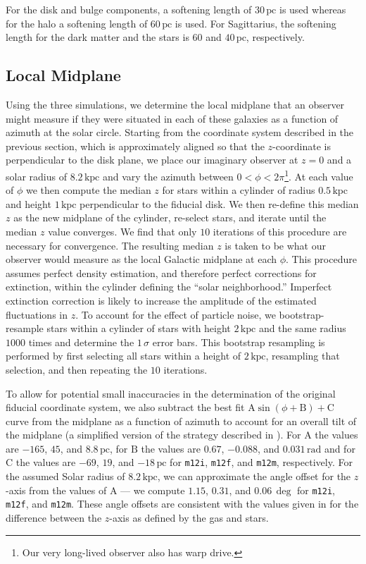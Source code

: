 \documentclass[twocolumn]{aastex62}
\newcommand{\pc}{\text{pc}}
\newcommand{\kpc}{\text{kpc}}
\newcommand{\mi}{\texttt{m12i}}
\newcommand{\mf}{\texttt{m12f}}
\newcommand{\mm}{\texttt{m12m}}
\begin{document}
For the disk and bulge components, a softening length of $30\,\pc$ is used
whereas for the halo a softening length of $60\,\pc$ is used. For Sagittarius,
the softening length for the dark matter and the stars is $60$ and $40\,\pc$,
respectively.

\subsection{Local Midplane} \label{ssec:local_midplane}
Using the three simulations, we determine the local midplane that an observer
might measure if they were situated in each of these galaxies as a function of
azimuth at the solar circle. Starting from the coordinate system described in
the previous section, which is approximately aligned so that the
$z$-coordinate is perpendicular to the disk plane, we place our imaginary
observer at $z=0$ and a solar radius of $8.2\,\kpc$ and vary the azimuth
between $0<\phi<2\pi$\footnote{Our very long-lived observer also has warp
drive.}. At each value of $\phi$ we then compute the median $z$ for stars
within a cylinder of radius $0.5\,\kpc$ and height $1\,\kpc$ perpendicular to
the fiducial disk. We then re-define this median $z$ as the new midplane of
the cylinder, re-select stars, and iterate until the median $z$ value
converges. We find that only $10$ iterations of this procedure are necessary
for convergence. The resulting median $z$ is taken to be what our observer
would measure as the local Galactic midplane at each $\phi$. This procedure
assumes perfect density estimation, and therefore perfect corrections for
extinction, within the cylinder defining the ``solar neighborhood.'' Imperfect
extinction correction is likely to increase the amplitude of the estimated
fluctuations in $z$. To account for the effect of particle noise, we
bootstrap-resample stars within a cylinder of stars with height $2\,\kpc$ and
the same radius $1000$ times and determine the $1\,\sigma$ error bars. This
bootstrap resampling is performed by first selecting all stars within a height
of $2\,\kpc$, resampling that selection, and then repeating the $10$
iterations.

To allow for potential small inaccuracies in the determination of the original
fiducial coordinate system, we also subtract the best fit $\text{A}
\sin{\left(\phi + \text{B}\right)} + \text{C}$ curve from the midplane as a
function of azimuth to account for an overall tilt of the midplane (a
simplified version of the strategy described in
\citealt{2019ApJ...871..145A}). For $\text{A}$ the values are $-165$, $45$,
and $8.8\,\pc$, for $\text{B}$ the values are $0.67$, $-0.088$, and
$0.031\,\text{rad}$ and for $\text{C}$ the values are $-69$, $19$, and
$-18\,\pc$ for \mi{}, \mf{}, and \mm{}, respectively. For the assumed Solar
radius of $8.2\,\kpc$, we can approximate the angle offset for the $z$-axis
from the values of $\text{A}$ --- we compute $1.15$, $0.31$, and $0.06\,\deg$
for \mi{}, \mf{}, and \mm{}. These angle offsets are consistent with the
values given in \citet{2018arXiv180610564S} for the difference between the
$z$-axis as defined by the gas and stars.
\end{document}
